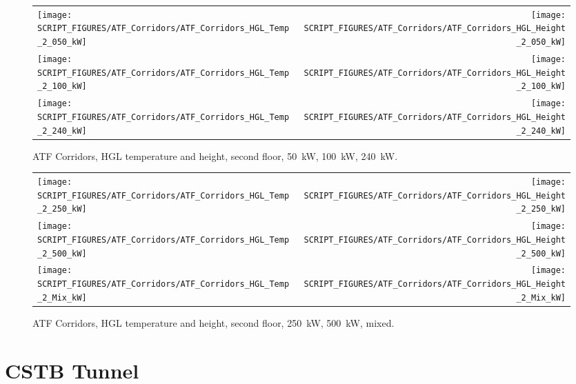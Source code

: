 \begin{figure}[p]
\begin{tabular*}{\textwidth}{l@{\extracolsep{\fill}}r}
\texttt{[image: SCRIPT\_FIGURES/ATF\_Corridors/ATF\_Corridors\_HGL\_Temp\_2\_050\_kW]} &
\texttt{[image: SCRIPT\_FIGURES/ATF\_Corridors/ATF\_Corridors\_HGL\_Height\_2\_050\_kW]} \\
\texttt{[image: SCRIPT\_FIGURES/ATF\_Corridors/ATF\_Corridors\_HGL\_Temp\_2\_100\_kW]} &
\texttt{[image: SCRIPT\_FIGURES/ATF\_Corridors/ATF\_Corridors\_HGL\_Height\_2\_100\_kW]} \\
\texttt{[image: SCRIPT\_FIGURES/ATF\_Corridors/ATF\_Corridors\_HGL\_Temp\_2\_240\_kW]} &
\texttt{[image: SCRIPT\_FIGURES/ATF\_Corridors/ATF\_Corridors\_HGL\_Height\_2\_240\_kW]}
\end{tabular*}
\caption[ATF Corridors, HGL temperature and height, second floor, 50~kW, 100~kW, 240~kW]
{ATF Corridors, HGL temperature and height, second floor, 50~kW, 100~kW, 240~kW.}
\label{ATF_Corridors_HGL_3}
\end{figure}

\begin{figure}[p]
\begin{tabular*}{\textwidth}{l@{\extracolsep{\fill}}r}
\texttt{[image: SCRIPT\_FIGURES/ATF\_Corridors/ATF\_Corridors\_HGL\_Temp\_2\_250\_kW]} &
\texttt{[image: SCRIPT\_FIGURES/ATF\_Corridors/ATF\_Corridors\_HGL\_Height\_2\_250\_kW]} \\
\texttt{[image: SCRIPT\_FIGURES/ATF\_Corridors/ATF\_Corridors\_HGL\_Temp\_2\_500\_kW]} &
\texttt{[image: SCRIPT\_FIGURES/ATF\_Corridors/ATF\_Corridors\_HGL\_Height\_2\_500\_kW]} \\
\texttt{[image: SCRIPT\_FIGURES/ATF\_Corridors/ATF\_Corridors\_HGL\_Temp\_2\_Mix\_kW]} &
\texttt{[image: SCRIPT\_FIGURES/ATF\_Corridors/ATF\_Corridors\_HGL\_Height\_2\_Mix\_kW]}
\end{tabular*}
\caption[ATF Corridors, HGL temperature and height, second floor, 250~kW, 500~kW, mixed]
{ATF Corridors, HGL temperature and height, second floor, 250~kW, 500~kW, mixed.}
\label{ATF_Corridors_HGL_4}
\end{figure}

\clearpage


\section{CSTB Tunnel}

